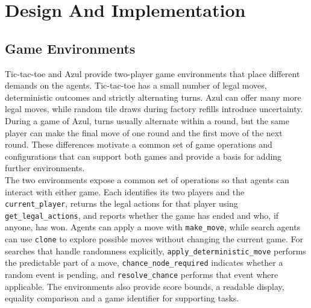 \section{Design And Implementation}

\subsection{Game Environments}
Tic-tac-toe and Azul provide two-player game environments that place different demands on the agents. Tic-tac-toe has a small number of legal moves, deterministic outcomes and strictly alternating turns. Azul can offer many more legal moves, while random tile draws during factory refills introduce uncertainty. During a game of Azul, turns usually alternate within a round, but the same player can make the final move of one round and the first move of the next round. These differences motivate a common set of game operations and configurations that can support both games and provide a basis for adding further environments.\\

The two environments expose a common set of operations so that agents can interact with either game. Each identifies its two players and the \texttt{current\_player}, returns the legal actions for that player using \texttt{get\_legal\_actions}, and reports whether the game has ended and who, if anyone, has won. Agents can apply a move with \texttt{make\_move}, while search agents can use \texttt{clone} to explore possible moves without changing the current game. For searches that handle randomness explicitly, \texttt{apply\_deterministic\_move} performs the predictable part of a move, \texttt{chance\_node\_required} indicates whether a random event is pending, and \texttt{resolve\_chance} performs that event where applicable. The environments also provide score bounds, a readable display, equality comparison and a game identifier for supporting tasks.\\

